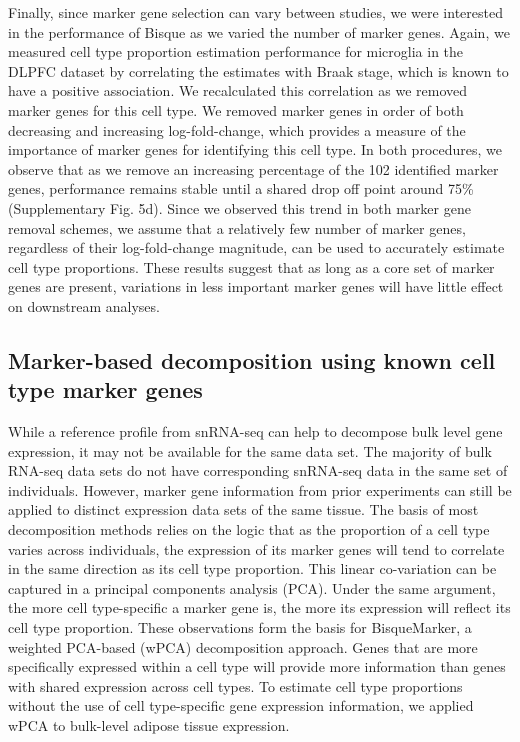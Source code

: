 Finally, since marker gene selection can vary between studies, we were interested in the performance of Bisque as we varied the number of marker genes. Again, we measured cell type proportion estimation performance for microglia in the DLPFC dataset by correlating the estimates with Braak stage, which is known to have a positive association. We recalculated this correlation as we removed marker genes for this cell type. We removed marker genes in order of both decreasing and increasing log-fold-change, which provides a measure of the importance of marker genes for identifying this cell type. In both procedures, we observe that as we remove an increasing percentage of the 102 identified marker genes, performance remains stable until a shared drop off point around 75\% (Supplementary Fig. 5d). Since we observed this trend in both marker gene removal schemes, we assume that a relatively few number of marker genes, regardless of their log-fold-change magnitude, can be used to accurately estimate cell type proportions. These results suggest that as long as a core set of marker genes are present, variations in less important marker genes will have little effect on downstream analyses.

\subsection{Marker-based decomposition using known cell type marker genes }

While a reference profile from snRNA-seq can help to decompose bulk level gene expression, it may not be available for the same data set. The majority of bulk RNA-seq data sets do not have corresponding snRNA-seq data in the same set of individuals. However, marker gene information from prior experiments can still be applied to distinct expression data sets of the same tissue. The basis of most decomposition methods relies on the logic that as the proportion of a cell type varies across individuals, the expression of its marker genes will tend to correlate in the same direction as its cell type proportion. This linear co-variation can be captured in a principal components analysis (PCA). Under the same argument, the more cell type-specific a marker gene is, the more its expression will reflect its cell type proportion. These observations form the basis for BisqueMarker, a weighted PCA-based (wPCA) decomposition approach. Genes that are more specifically expressed within a cell type will provide more information than genes with shared expression across cell types. To estimate cell type proportions without the use of cell type-specific gene expression information, we applied wPCA to bulk-level adipose tissue expression.


